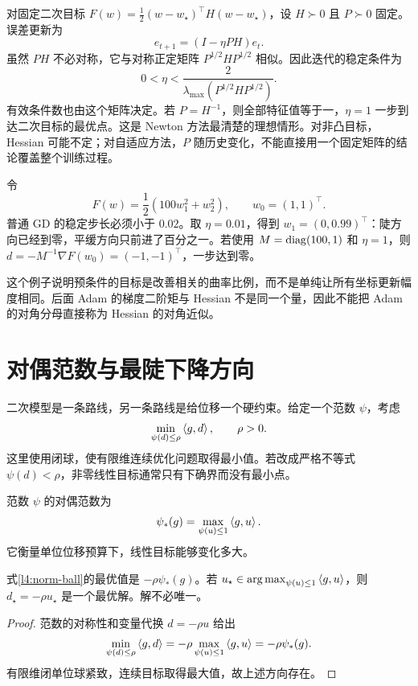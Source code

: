 对固定二次目标 $F(w)=\tfrac12(w-w_\star)^\top H(w-w_\star)$，设 $H\succ0$ 且 $P\succ0$ 固定。误差更新为
\[
 e_{t+1}=(I-\eta PH)e_t.
\]
虽然 $PH$ 不必对称，它与对称正定矩阵 $P^{1/2}HP^{1/2}$ 相似。因此迭代的稳定条件为
\begin{equation}
 0<\eta<\frac{2}{\lambda_{\max}(P^{1/2}HP^{1/2})}.
 \label{l4:preconditioned-stability}
\end{equation}
有效条件数也由这个矩阵决定。若 $P=H^{-1}$，则全部特征值等于一，$\eta=1$ 一步到达二次目标的最优点。这是 Newton 方法最清楚的理想情形。对非凸目标，Hessian 可能不定；对自适应方法，$P$ 随历史变化，不能直接用一个固定矩阵的结论覆盖整个训练过程\citep{Nocedal2006}。

\begin{example}[改变度量解决各向异性]
令
\[
 F(w)=\frac12(100w_1^2+w_2^2),\qquad w_0=(1,1)^\top.
\]
普通 GD 的稳定步长必须小于 $0.02$。取 $\eta=0.01$，得到
$w_1=(0,0.99)^\top$：陡方向已经到零，平缓方向只前进了百分之一。若使用 $M=\operatorname{diag}(100,1)$ 和 $\eta=1$，则
$d=-M^{-1}\nabla F(w_0)=(-1,-1)^\top$，一步达到零。

这个例子说明预条件的目标是改善相关的曲率比例，而不是单纯让所有坐标更新幅度相同。后面 Adam 的梯度二阶矩与 Hessian 不是同一个量，因此不能把 Adam 的对角分母直接称为 Hessian 的对角近似。
\end{example}

\section{对偶范数与最陡下降方向}
\label{l4:dual-norm}

二次模型是一条路线，另一条路线是给位移一个硬约束。给定一个范数 $\psi$，考虑
\begin{equation}
 \min_{\psi(d)\leq\rho}\left\langle g,d\right\rangle,\qquad\rho>0.
 \label{l4:norm-ball}
\end{equation}
这里使用闭球，使有限维连续优化问题取得最小值。若改成严格不等式 $\psi(d)<\rho$，非零线性目标通常只有下确界而没有最小点。

\begin{definition}[对偶范数]
范数 $\psi$ 的对偶范数为
\begin{equation}
 \psi_*(g)=\max_{\psi(u)\leq1}\left\langle g,u\right\rangle.
 \label{l4:dual-norm-definition}
\end{equation}
它衡量单位位移预算下，线性目标能够变化多大。
\end{definition}

\begin{proposition}[范数球内的线性最小化]
式\eqref{l4:norm-ball}的最优值是 $-\rho\psi_*(g)$。若
$u_\star\in\operatorname*{arg\,max}_{\psi(u)\leq1}\left\langle g,u\right\rangle$，则
$d_\star=-\rho u_\star$ 是一个最优解。解不必唯一。
\end{proposition}
\begin{proof}
范数的对称性和变量代换 $d=-\rho u$ 给出
\[
 \min_{\psi(d)\leq\rho}\left\langle g,d\right\rangle
 =-\rho\max_{\psi(u)\leq1}\left\langle g,u\right\rangle
 =-\rho\psi_*(g).
\]
有限维闭单位球紧致，连续目标取得最大值，故上述方向存在。
\end{proof}

